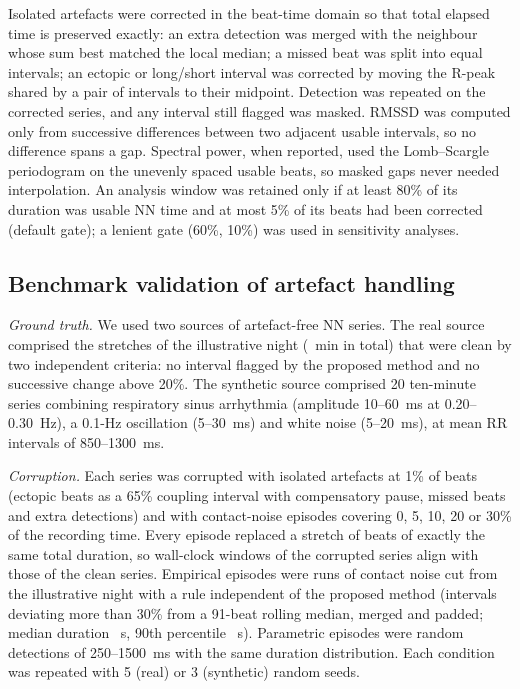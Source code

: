\documentclass[11pt,a4paper]{article}
\begin{document}
Isolated artefacts were corrected in the beat-time domain so that total elapsed time is preserved exactly: an extra detection was merged with the neighbour whose sum best matched the local median; a missed beat was split into equal intervals; an ectopic or long/short interval was corrected by moving the R-peak shared by a pair of intervals to their midpoint. Detection was repeated on the corrected series, and any interval still flagged was masked. RMSSD was computed only from successive differences between two adjacent usable intervals, so no difference spans a gap. Spectral power, when reported, used the Lomb--Scargle periodogram on the unevenly spaced usable beats,\autocite{laguna1998,clifford2005} so masked gaps never needed interpolation. An analysis window was retained only if at least 80\% of its duration was usable NN time and at most 5\% of its beats had been corrected (default gate); a lenient gate (60\%, 10\%) was used in sensitivity analyses.

\subsection{Benchmark validation of artefact handling}
\textit{Ground truth.} We used two sources of artefact-free NN series. The real source comprised the \nRealSegments{} stretches of the illustrative night (\realMinutes{}~min in total) that were clean by two independent criteria: no interval flagged by the proposed method and no successive change above 20\%. The synthetic source comprised 20 ten-minute series combining respiratory sinus arrhythmia (amplitude 10--60~ms at 0.20--0.30~Hz), a 0.1-Hz oscillation (5--30~ms) and white noise (5--20~ms), at mean RR intervals of 850--1300~ms.

\textit{Corruption.} Each series was corrupted with isolated artefacts at 1\% of beats (ectopic beats as a 65\% coupling interval with compensatory pause, missed beats and extra detections) and with contact-noise episodes covering 0, 5, 10, 20 or 30\% of the recording time. Every episode replaced a stretch of beats of exactly the same total duration, so wall-clock windows of the corrupted series align with those of the clean series. Empirical episodes were \nNoiseEpisodes{} runs of contact noise cut from the illustrative night with a rule independent of the proposed method (intervals deviating more than 30\% from a 91-beat rolling median, merged and padded; median duration \noiseMedianS{}~s, 90th percentile \noiseNinetyS{}~s). Parametric episodes were random detections of 250--1500~ms with the same duration distribution. Each condition was repeated with 5 (real) or 3 (synthetic) random seeds.
\end{document}
